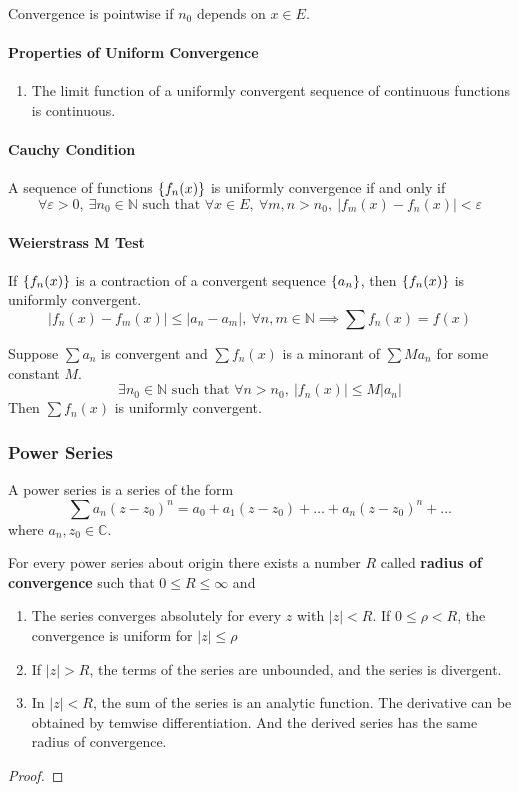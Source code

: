 Convergence is pointwise if $n_0$ depends on $x \in E$.
\paragraph{Properties of Uniform Convergence}
\begin{enumerate}
	\item The limit function of a uniformly convergent sequence of continuous functions is continuous.
\end{enumerate}

\paragraph{Cauchy Condition}
A sequence of functions $\left\{f_n(x)\right\}$ is uniformly convergence if and only if
	\[ \forall \varepsilon > 0, \ \exists n_0 \in \mathbb{N} \text{ such that } \forall x \in E,\ \forall m,n > n_0, \ |f_m(x)-f_n(x)| < \varepsilon \]

\paragraph{Weierstrass M Test}
If $\left\{f_n(x)\right\}$ is a contraction of a convergent sequence $\left\{a_n\right\}$, then $\left\{f_n(x)\right\}$ is uniformly convergent.
\[ |f_n(x)-f_m(x)| \le |a_n - a_m|, \ \forall n,m \in \mathbb{N} \implies \sum f_n(x) = f(x) \]

Suppose $\sum a_n$ is convergent and $\sum f_n(x)$ is a minorant of $\sum Ma_n$ for some constant $M$.
\[ \exists n_0 \in \mathbb{N} \text{ such that } \forall n > n_0,\ |f_n(x)| \le M|a_n| \]
Then $\sum f_n(x) $ is uniformly convergent.

\subsubsection{Power Series}
\begin{definition}
	A power series is a series of the form
	\[ \sum a_n (z-z_0)^n = a_0 + a_1(z-z_0) + \dots + a_n(z-z_0)^n + \dots \]
	where $a_n,z_0 \in \mathbb{C}$.
\end{definition}

\begin{theorem}
	For every power series about origin there exists a number $R$ called \textbf{radius of convergence} such that $0 \le R \le \infty$ and
	\begin{enumerate}
		\item The series converges absolutely for every $z$ with $|z|<R$.
		If $0 \le \rho < R$, the convergence is uniform for $|z| \le \rho$

		\item If $|z|>R$, the terms of the series are unbounded, and the series is divergent.

		\item In $|z| <R$, the sum of the series is an analytic function. The derivative can be obtained by temwise differentiation.
			And the derived series has the same radius of convergence.
	\end{enumerate}
\end{theorem}
\begin{proof}
\end{proof}


